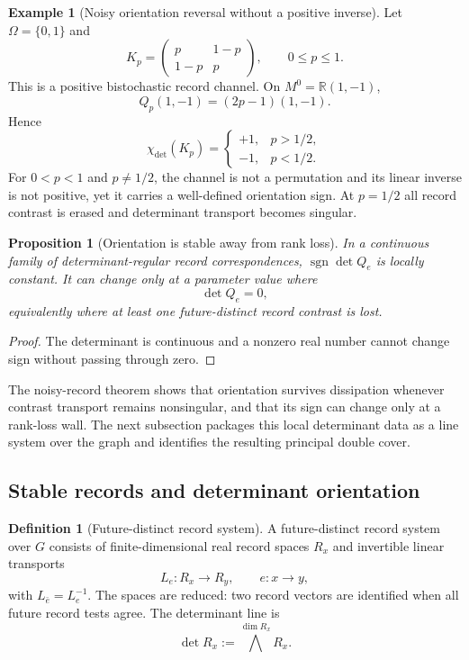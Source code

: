 \documentclass[11pt]{article}
\newtheorem{proposition}[theorem]{Proposition}
\theoremstyle{definition}
\newtheorem{definition}[theorem]{Definition}
\newtheorem{example}[theorem]{Example}
\theoremstyle{remark}
\newcommand{\R}{\mathbb R}
\newcommand{\sgn}{\operatorname{sgn}}
\begin{document}
\begin{example}[Noisy orientation reversal without a positive inverse]
\label{ex:noisy-binary-record}
Let $\Omega=\{0,1\}$ and
\[
 K_p=
 \begin{pmatrix}
 p&1-p\\
 1-p&p
 \end{pmatrix},
 \qquad 0\le p\le1.
\]
This is a positive bistochastic record channel.  On
$M^0=\R(1,-1)$,
\[
 Q_p(1,-1)=(2p-1)(1,-1).
\]
Hence
\[
 \chi_{\det}(K_p)=
 \begin{cases}
 +1,&p>1/2,\\
 -1,&p<1/2.
 \end{cases}
\]
For $0<p<1$ and $p\ne1/2$, the channel is not a permutation and its linear
inverse is not positive, yet it carries a well-defined orientation sign.  At
$p=1/2$ all record contrast is erased and determinant transport becomes
singular.
\end{example}

\begin{proposition}[Orientation is stable away from rank loss]
\label{prop:noisy-record-sign-stability}
In a continuous family of determinant-regular record correspondences,
$\sgn\det Q_e$ is locally constant.  It can change only at a parameter value
where
\[
 \det Q_e=0,
\]
equivalently where at least one future-distinct record contrast is lost.
\end{proposition}

\begin{proof}
The determinant is continuous and a nonzero real number cannot change sign
without passing through zero.
\end{proof}

The noisy-record theorem shows that orientation survives dissipation whenever
contrast transport remains nonsingular, and that its sign can change only at a
rank-loss wall.  The next subsection packages this local determinant data as a
line system over the graph and identifies the resulting principal double cover.

\subsection{Stable records and determinant orientation}

\begin{definition}[Future-distinct record system]
\label{def:record-system}
A future-distinct record system over $G$ consists of finite-dimensional real
record spaces $R_x$ and invertible linear transports
\[
 L_e:R_x\longrightarrow R_y,
 \qquad e:x\to y,
\]
with $L_{\bar e}=L_e^{-1}$.  The spaces are reduced: two record vectors are
identified when all future record tests agree.  The determinant line is
\[
 \det R_x:=\bigwedge^{\dim R_x}R_x.
\]
\end{definition}
\end{document}
